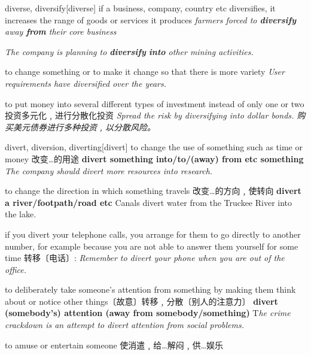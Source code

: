 \begin{word}{diverse, diversify}[diverse]
    if a business, company, country etc diversifies, it increases the range of goods or services it produces
    \textit{farmers forced to \textbf{diversify} away \textbf{from} their core business}

    \textit{The company is planning to \textbf{diversify} \textbf{into} other mining activities.}

    to change something or to make it change so that there is more variety
    \textit{User requirements have diversified over the years.}

    to put money into several different types of investment instead of only one or two 投资多元化﹐进行分散化投资
    \textit{Spread the risk by diversifying into dollar bonds. 购买美元债券进行多种投资﹐以分散风险。}

\end{word}

\begin{word}{divert, diversion, diverting}[divert]
    to change the use of something such as time or money 改变…的用途
    \textbf{divert something into/to/(away) from etc something}
    \textit{The company should divert more resources into research.}

    to change the direction in which something travels 改变…的方向﹐使转向
    \textbf{divert a river/footpath/road etc}
    Canals divert water from the Truckee River into the lake.

    if you divert your telephone calls, you arrange for them to go directly to another number, for example because you are not able to answer them yourself for some time 转移〔电话〕:
    \textit{Remember to divert your phone when you are out of the office.}

    to deliberately take someone’s attention from something by making them think about or notice other things〔故意〕转移﹐分散〔别人的注意力〕
    \textbf{divert (somebody’s) attention (away from somebody/something)}
    T\textit{he crime crackdown is an attempt to divert attention from social problems.}
 
    to amuse or entertain someone 使消遣﹐给…解闷﹐供…娱乐

\end{word}
